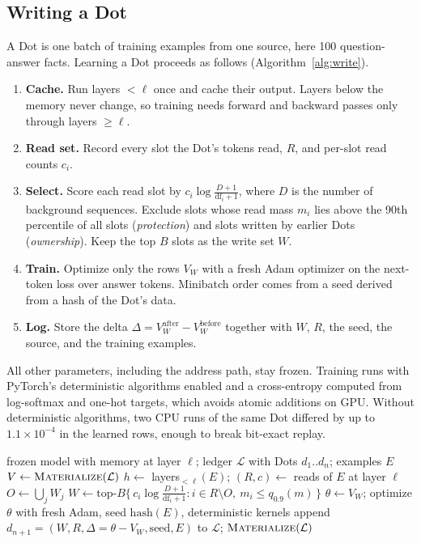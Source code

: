 \documentclass[journal]{IEEEtran}
\let\citep\cite \let\citet\cite
\begin{document}
\subsection{Writing a Dot}
\label{sec:write}

A Dot is one batch of training examples from one source, here 100 question-answer facts. Learning a Dot proceeds as follows (Algorithm~\ref{alg:write}).

\begin{enumerate}
  \item \textbf{Cache.} Run layers $<\ell$ once and cache their output. Layers below the memory never change, so training needs forward and backward passes only through layers $\geq\ell$.
  \item \textbf{Read set.} Record every slot the Dot's tokens read, $R$, and per-slot read counts $c_i$.
  \item \textbf{Select.} Score each read slot by $c_i \log\frac{D+1}{\mathrm{df}_i+1}$, where $D$ is the number of background sequences. Exclude slots whose read mass $m_i$ lies above the 90th percentile of all slots (\emph{protection}) and slots written by earlier Dots (\emph{ownership}). Keep the top $B$ slots as the write set $W$.
  \item \textbf{Train.} Optimize only the rows $V_W$ with a fresh Adam optimizer \citep{kingma2015adam} on the next-token loss over answer tokens. Minibatch order comes from a seed derived from a hash of the Dot's data.
  \item \textbf{Log.} Store the delta $\Delta = V_W^{\text{after}} - V_W^{\text{before}}$ together with $W$, $R$, the seed, the source, and the training examples.
\end{enumerate}

All other parameters, including the address path, stay frozen. Training runs with PyTorch's deterministic algorithms enabled \citep{pytorchrepro} and a cross-entropy computed from log-softmax and one-hot targets, which avoids atomic additions on GPU. Without deterministic algorithms, two CPU runs of the same Dot differed by up to $1.1\times10^{-4}$ in the learned rows, enough to break bit-exact replay.

\begin{algorithm}[t]
\caption{Learning a Dot and recording it in the ledger}
\label{alg:write}
\begin{algorithmic}[1]
\Require frozen model with memory at layer $\ell$; ledger $\mathcal{L}$ with Dots $d_1..d_n$; examples $E$
\State $V \gets \textsc{Materialize}(\mathcal{L})$ 
\State $h \gets$ layers$_{<\ell}(E)$; \; $(R, c) \gets$ reads of $E$ at layer $\ell$
\State $O \gets \bigcup_j W_j$ 
\State $W \gets \mathrm{top}\text{-}B\{\, c_i \log\frac{D+1}{\mathrm{df}_i+1} : i \in R \setminus O,\ m_i \le q_{0.9}(m) \,\}$
\State $\theta \gets V_W$; optimize $\theta$ with fresh Adam, seed $\mathrm{hash}(E)$, deterministic kernels
\State append $d_{n+1} = (W, R, \Delta = \theta - V_W, \mathrm{seed}, E)$ to $\mathcal{L}$; \Return $\textsc{Materialize}(\mathcal{L})$
\end{algorithmic}
\end{algorithm}
\end{document}

